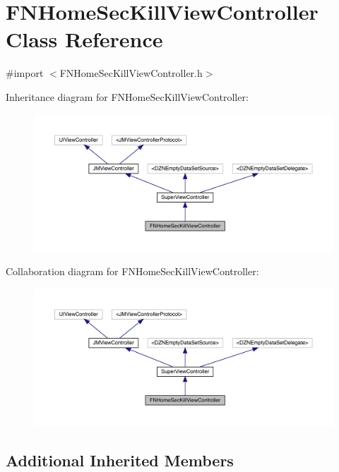 \hypertarget{interface_f_n_home_sec_kill_view_controller}{}\section{F\+N\+Home\+Sec\+Kill\+View\+Controller Class Reference}
\label{interface_f_n_home_sec_kill_view_controller}


{\ttfamily \#import $<$F\+N\+Home\+Sec\+Kill\+View\+Controller.\+h$>$}



Inheritance diagram for F\+N\+Home\+Sec\+Kill\+View\+Controller\+:\nopagebreak
\begin{figure}[H]
\begin{center}
\leavevmode
\includegraphics[width=350pt]{interface_f_n_home_sec_kill_view_controller__inherit__graph}
\end{center}
\end{figure}


Collaboration diagram for F\+N\+Home\+Sec\+Kill\+View\+Controller\+:\nopagebreak
\begin{figure}[H]
\begin{center}
\leavevmode
\includegraphics[width=350pt]{interface_f_n_home_sec_kill_view_controller__coll__graph}
\end{center}
\end{figure}
\subsection*{Additional Inherited Members}


